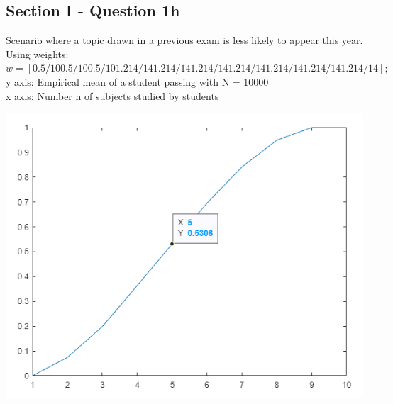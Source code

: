 \documentclass{article}
\begin{document}
\subsection*{Section I - Question 1h}
Scenario where a topic drawn in a previous exam 
is less likely to appear this year. Using weights:\\
$ w = [0.5/10 0.5/10 0.5/10 1.214/14 1.214/14 1.214/14 1.214/14 1.214/14 1.214/14 1.214/14];$\\
y axis: Empirical mean of a student passing with N = 10000 \\
x axis: Number n of subjects studied by students
\begin{center}
    \includegraphics[scale=0.5]{p4}
\end{center}
\end{document}
